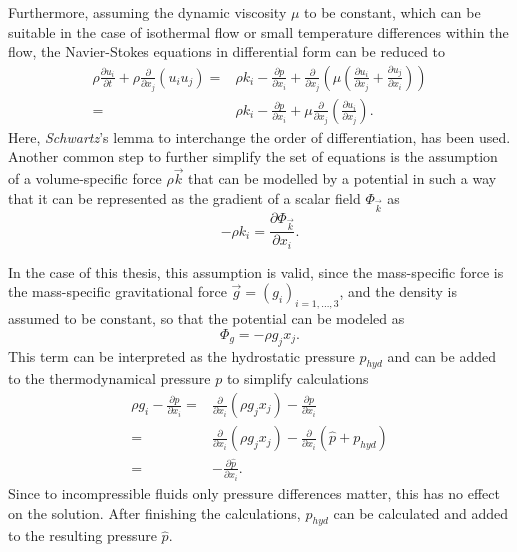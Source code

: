Furthermore, assuming the dynamic viscosity \(\mu\) to be constant, which can be suitable in the case of isothermal flow or small temperature differences within the flow, the Navier-Stokes equations in differential form can be reduced to 
\begin{subequations}
\label{eq:navierstokes}
\begin{align}
  \rho \frac{\partial u_i}{\partial t}   
  + \rho \frac{\partial}{\partial x_j} \left( u_i  u_j \right) 
  =& \rho k_i
  - \frac{\partial p}{\partial x_i}
+ \frac{\partial}{\partial x_j} \left( \mu  \left( \frac{\partial u_i}{\partial x_j} 
+ \frac{\partial u_j}{\partial x_i} \right) \right) \\[0.5em]
  =& \rho k_i
  - \frac{\partial p}{\partial x_i}
  + \mu \frac{\partial}{\partial x_j} \left( \frac{\partial u_i}{\partial x_j} \right).
\end{align}
\end{subequations}
Here, \emph{Schwartz}'s lemma to interchange the order of differentiation, has been used. Another common step to further simplify the set of equations is the assumption of a volume-specific force \(\rho \vec{k}\) that can be modelled by a potential in such a way that it can be represented as the gradient of a scalar field \(\Phi_\vec{k}\) as
\begin{displaymath}
 - \rho k_i = \frac{\partial \Phi_\vec{k}}{\partial x_i}.
\end{displaymath}

In the case of this thesis, this assumption is valid, since the mass-specific force is the mass-specific gravitational force \(\vec{g} = \left( g_i \right)_{i = 1,\dots,3}\), and the density is assumed to be constant, so that the potential can be modeled as
\begin{displaymath}
  \Phi_g = - \rho g_j x_j.
\end{displaymath}
This term can be interpreted as the hydrostatic pressure \(p_{hyd}\) and can be added to the thermodynamical pressure \(p\) to simplify calculations 
\begin{align*}
  \rho g_i - \frac{\partial p}{\partial x_i} 
  =& \frac{\partial}{\partial x_i} \left( \rho g_j x_j \right) - \frac{\partial p}{\partial x_i} \nonumber \\[0.5em]
  =& \frac{\partial}{\partial x_i} \left( \rho g_j x_j \right) - \frac{\partial}{\partial x_i}  \left(\hat{p} + p_{hyd} \right) \nonumber \\[0.5em]
  =& - \frac{\partial \hat{p}}{\partial x_i}.
\end{align*}
Since to incompressible fluids only pressure differences matter, this has no effect on the solution. After finishing the calculations, \(p_{hyd}\) can be calculated and added to the resulting pressure \(\hat{p}\).

